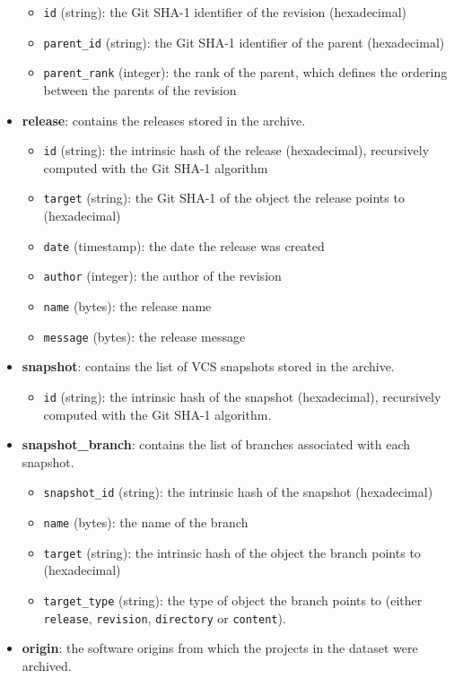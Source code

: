 \begin{itemize}
  \begin{itemize}
  \tightlist
  \item
    \texttt{id} (string): the Git SHA-1 identifier of the revision
    (hexadecimal)
  \item
    \texttt{parent\_id} (string): the Git SHA-1 identifier of the parent
    (hexadecimal)
  \item
    \texttt{parent\_rank} (integer): the rank of the parent, which
    defines the ordering between the parents of the revision
  \end{itemize}
\item
  \textbf{release}: contains the releases stored in the archive.

  \begin{itemize}
  \tightlist
  \item
    \texttt{id} (string): the intrinsic hash of the release
    (hexadecimal), recursively computed with the Git SHA-1 algorithm
  \item
    \texttt{target} (string): the Git SHA-1 of the object the release
    points to (hexadecimal)
  \item
    \texttt{date} (timestamp): the date the release was created
  \item
    \texttt{author} (integer): the author of the revision
  \item
    \texttt{name} (bytes): the release name
  \item
    \texttt{message} (bytes): the release message
  \end{itemize}
\item
  \textbf{snapshot}: contains the list of \gls{VCS} snapshots stored in the
  archive.

  \begin{itemize}
  \tightlist
  \item
    \texttt{id} (string): the intrinsic hash of the snapshot
    (hexadecimal), recursively computed with the Git SHA-1 algorithm.
  \end{itemize}
\item
  \textbf{snapshot\_branch}: contains the list of branches associated
  with each snapshot.

  \begin{itemize}
  \tightlist
  \item
    \texttt{snapshot\_id} (string): the intrinsic hash of the snapshot
    (hexadecimal)
  \item
    \texttt{name} (bytes): the name of the branch
  \item
    \texttt{target} (string): the intrinsic hash of the object the
    branch points to (hexadecimal)
  \item
    \texttt{target\_type} (string): the type of object the branch points
    to (either \texttt{release}, \texttt{revision}, \texttt{directory}
    or \texttt{content}).
  \end{itemize}
\item
  \textbf{origin}: the software origins from which the projects in the
  dataset were archived.


\end{itemize}
